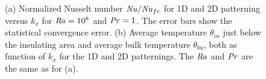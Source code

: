 \documentclass{jfm}
\newcommand\Pran{\mbox{\textit{Pr}}} %
\newcommand\Ray{\mbox{\textit{Ra}}}  %
\newcommand\Nus{\mbox{\textit{Nu}}}  %
\begin{document}
\begin{figure}
\centering
{}
\caption{%
(a) Normalized Nusselt number $\Nus/\Nus_{fc}$ for 1D and 2D patterning
versus $k_x$ for $\Ray=10^8$ and
$\Pran=1$.  The error bars show the statistical convergence error.  (b)
Average temperature $\theta_{in}$ just below the insulating area and
average bulk temperature $\theta_{bu}$, both as function of $k_x$ for the
1D and 2D patternings.  The $\Ray$ and $\Pran$ are the same as for (a).  }
\label{figure14}%
\end{figure}%
\end{document}

